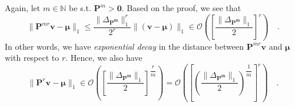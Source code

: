 \documentclass[../../main.tex]{subfiles}
\begin{document}
\begin{remark}
    \label{remark:exponential_decay}
    Again, let $m \in \mathbb{N}$ be s.t. $\bm{P}^m > \bm{0}$. Based on the proof, we see that
    \[
        \| \bm{P}^{mr} \bm{v} - \bm{\mu} \|_1 \leq \dfrac{\|\Delta_{\bm{P^m}}\|_1^r}{2^r} \| (\bm{v} - \bm{\mu}) \|_1 \in \mathcal{O} \left( \left[ \frac{\|\Delta_{\bm{P^m}}\|_1}{2} \right] ^r \right) \quad .
    \]
    In other words, we have \emph{exponential decay} in the distance between $\bm{P}^{mr} \bm{v}$ and $\bm{\mu}$ with respect to $r$. Hence, we also have
    \[
        \| \bm{P}^{r} \bm{v} - \bm{\mu} \|_1 \in \mathcal{O} \left( \left[ \frac{\|\Delta_{\bm{P^m}}\|_1}{2} \right] ^{\dfrac{r}{m}} \right) = 
        \mathcal{O} \left( \left[ \left( \frac{\|\Delta_{\bm{P^m}}\|_1}{2} \right) ^{\dfrac{1}{m}} \right] ^r \right) \quad .
    \]
\end{remark}

\end{document}
